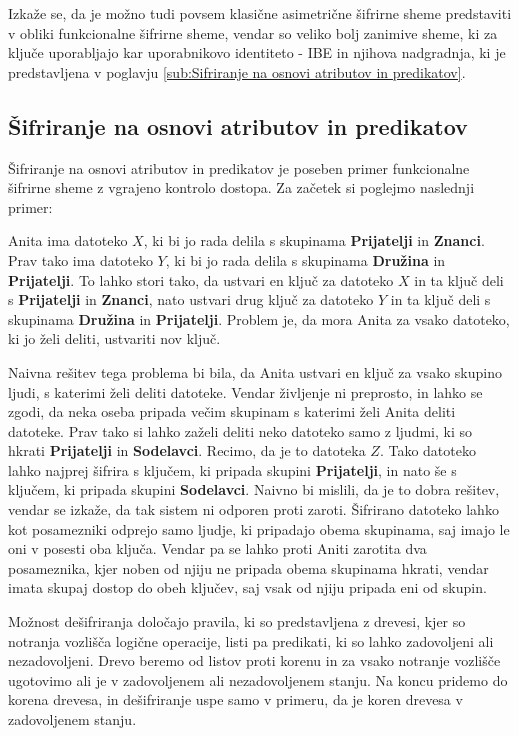 \documentclass[12pt,a4paper,openany,tikz]{book}
\theoremstyle{plain}
\theoremstyle{definition}
\begin{document}
Izkaže se, da je možno tudi povsem klasične asimetrične šifrirne sheme predstaviti v obliki funkcionalne šifrirne sheme, vendar so veliko bolj zanimive sheme, ki za ključe uporabljajo kar uporabnikovo identiteto - \gls{IBE} in njihova nadgradnja, ki je predstavljena v poglavju \ref{sub:Sifriranje na osnovi atributov in predikatov}.

\subsection*{Šifriranje na osnovi atributov in predikatov}
\label{sub:Sifriranje na osnovi atributov in predikatov}

Šifriranje na osnovi atributov in predikatov je poseben primer funkcionalne šifrirne sheme z vgrajeno kontrolo dostopa. Za začetek si poglejmo naslednji primer:

Anita ima datoteko $X$, ki bi jo rada delila s skupinama \textbf{Prijatelji} in \textbf{Znanci}. Prav tako ima datoteko $Y$, ki bi jo rada delila s skupinama \textbf{Družina} in \textbf{Prijatelji}. To lahko stori tako, da ustvari en ključ za datoteko $X$ in ta ključ deli s \textbf{Prijatelji} in  \textbf{Znanci}, nato ustvari drug ključ za datoteko $Y$ in ta ključ deli s skupinama \textbf{Družina} in \textbf{Prijatelji}. Problem je, da mora Anita za vsako datoteko, ki jo želi deliti, ustvariti nov ključ.

Naivna rešitev tega problema bi bila, da Anita ustvari en ključ za vsako skupino ljudi, s katerimi želi deliti datoteke. Vendar življenje ni preprosto, in lahko se zgodi, da neka oseba pripada večim skupinam s katerimi želi Anita deliti datoteke. Prav tako si lahko zaželi deliti neko datoteko samo z ljudmi, ki so hkrati \textbf{Prijatelji} in \textbf{Sodelavci}. Recimo, da je to datoteka $Z$. Tako datoteko lahko najprej šifrira s ključem, ki pripada skupini \textbf{Prijatelji}, in nato še s ključem, ki pripada skupini \textbf{Sodelavci}. Naivno bi mislili, da je to dobra rešitev, vendar se izkaže, da tak sistem ni odporen proti zaroti. Šifrirano datoteko lahko kot posamezniki odprejo samo ljudje, ki pripadajo obema skupinama, saj imajo le oni v posesti oba ključa. Vendar pa se lahko proti Aniti zarotita dva posameznika, kjer noben od njiju ne pripada obema skupinama hkrati, vendar imata skupaj dostop do obeh ključev, saj vsak od njiju pripada eni od skupin.

Možnost dešifriranja določajo pravila, ki so predstavljena z drevesi, kjer so notranja vozlišča logične operacije, listi pa predikati, ki so lahko zadovoljeni ali nezadovoljeni. Drevo beremo od listov proti korenu in za vsako notranje vozlišče ugotovimo ali je v zadovoljenem ali nezadovoljenem stanju. Na koncu pridemo do korena drevesa, in dešifriranje uspe samo v primeru, da je koren drevesa v zadovoljenem stanju.
\end{document}
